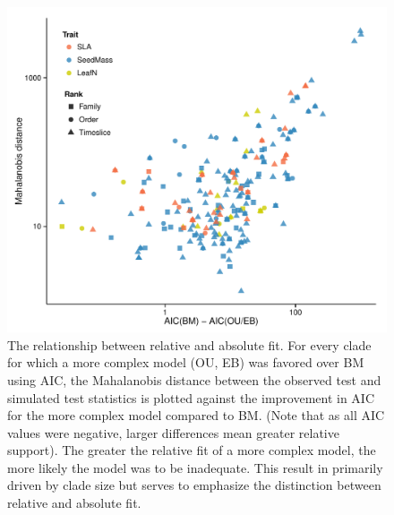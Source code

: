 \documentclass[a4paper,11pt]{article}
\begin{document}
\begin{figure}[p]
  \centering
  \includegraphics[scale=0.8]{figs/ad-aic}
  \caption{The relationship between relative and absolute fit. For every clade for which a more complex model (OU, EB) was favored over BM using AIC, the Mahalanobis distance between the observed test and simulated test statistics is plotted against the improvement in AIC for the more complex model compared to BM. (Note that as all AIC values were negative, larger differences mean greater relative support). The greater the relative fit of a more complex model, the more likely the model was to be inadequate. This result in primarily driven by clade size but serves to emphasize the distinction between relative and absolute fit.}
  \label{fig:supp-ad-aic}
\end{figure} 
\end{document}
